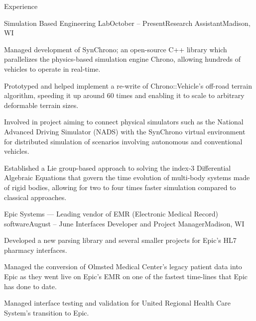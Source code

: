 \documentclass{resume} %
\begin{document}

\begin{rSection}{Experience}

\begin{rSubsection}{Simulation Based Engineering Lab}{October  -- Present}{Research Assistant}{Madison, WI}
\item Managed development of SynChrono; an open-source C++ library which parallelizes the physics-based simulation engine Chrono, allowing hundreds of vehicles to operate in real-time. 
\item Prototyped and helped implement a re-write of Chrono::Vehicle's off-road terrain algorithm, speeding it up around 60 times and enabling it to scale to arbitrary deformable terrain sizes.
\item Involved in project aiming to connect physical simulators such as the National Advanced Driving Simulator (NADS) with the SynChrono virtual environment for distributed simulation of scenarios involving autonomous and conventional vehicles.
\item Established a Lie group-based approach to solving the index-3 Differential Algebraic Equations that govern the time evolution of multi-body systems made of rigid bodies, allowing for two to four times faster simulation compared to classical approaches.
\end{rSubsection}

\begin{rSubsection}{Epic Systems \textnormal{--- Leading vendor of EMR (Electronic Medical Record) software}}{August  -- June }{Interfaces Developer and Project Manager}{Madison, WI}
\item Developed a new parsing library and several smaller projects for Epic's HL7 pharmacy interfaces.
\item Managed the conversion of Olmsted Medical Center's legacy patient data into Epic as they went live on Epic's EMR on one of the fastest time-lines that Epic has done to date.
\item Managed interface testing and validation for United Regional Health Care System's transition to Epic.
\end{rSubsection}


\end{rSection}
\end{document}
